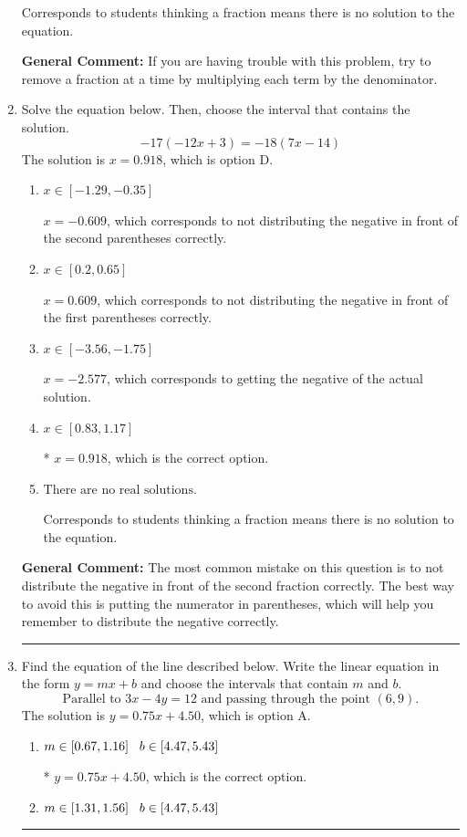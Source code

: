 \documentclass{extbook}[14pt]
\newcommand{\litem}[1]{\item #1

\rule{\textwidth}{0.4pt}}
\begin{document}
\begin{enumerate}
{\begin{enumerate}[label=\Alph*.]
Corresponds to students thinking a fraction means there is no solution to the equation.
\end{enumerate}

\textbf{General Comment:} If you are having trouble with this problem, try to remove a fraction at a time by multiplying each term by the denominator.
}
\litem{
Solve the equation below. Then, choose the interval that contains the solution.
\[ -17(-12x + 3) = -18(7x -14) \]The solution is \( x = 0.918 \), which is option D.\begin{enumerate}[label=\Alph*.]
\item \( x \in [-1.29, -0.35] \)

$x = -0.609$, which corresponds to not distributing the negative in front of the second parentheses correctly.
\item \( x \in [0.2, 0.65] \)

$x = 0.609$, which corresponds to not distributing the negative in front of the first parentheses correctly.
\item \( x \in [-3.56, -1.75] \)

$x = -2.577$, which corresponds to getting the negative of the actual solution.
\item \( x \in [0.83, 1.17] \)

* $x = 0.918$, which is the correct option.
\item \( \text{There are no real solutions.} \)

Corresponds to students thinking a fraction means there is no solution to the equation.
\end{enumerate}

\textbf{General Comment:} The most common mistake on this question is to not distribute the negative in front of the second fraction correctly. The best way to avoid this is putting the numerator in parentheses, which will help you remember to distribute the negative correctly.
}
\litem{
Find the equation of the line described below. Write the linear equation in the form $ y=mx+b $ and choose the intervals that contain $m$ and $b$.
\[ \text{Parallel to } 3 x - 4 y = 12 \text{ and passing through the point } (6, 9). \]The solution is \( y = 0.75x + 4.50 \), which is option A.\begin{enumerate}[label=\Alph*.]
\item \( m \in [0.67, 1.16] \hspace*{3mm} b \in [4.47, 5.43] \)

* $y = 0.75x + 4.50$, which is the correct option.
\item \( m \in [1.31, 1.56] \hspace*{3mm} b \in [4.47, 5.43] \)


\end{enumerate}}
\end{enumerate}
\end{document}
